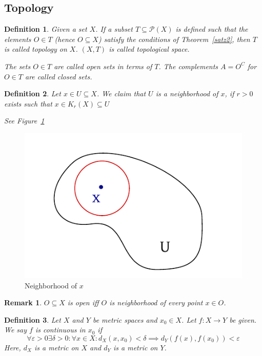\documentclass{article}
\newtheorem{definition}{Definition}  \numberwithin{definition}{section}
\newtheorem{remark}{Remark}  \numberwithin{remark}{section}
\begin{document}
\subsection{Topology}

\begin{definition}
  Given a set $X$. If a subset $T \subseteq \mathcal P(X)$ is defined
  such that the elements $O \in T$ (hence $O \subseteq X$) satisfy the conditions of Theorem~\ref{satz2},
  then $T$ is called \emph{topology on $X$}.
  $(X, T)$ is called topological space.

  The sets $O \in T$ are called \emph{open sets} in terms of $T$.
  The complements $A = O^C$ for $O \in T$ are called \emph{closed sets}.
\end{definition}

\begin{definition}
  Let $x \in U \subseteq X$. We claim that $U$ is a neighborhood of $x$,
  if $r > 0$ exists such that $x \in K_r(X) \subseteq U$

  See Figure~\ref{img:neigh}
\end{definition}

\begin{figure}
  \begin{center}
    \includegraphics{img/06_neighborhood.pdf}
    \caption{Neighborhood of $x$}
    \label{img:neigh}
  \end{center}
\end{figure}

\begin{remark}
  $O \subseteq X$ is open iff $O$ is neighborhood of every point $x \in O$.
\end{remark}

\begin{definition}
  Let $X$ and $Y$ be metric spaces and $x_0 \in X$.
  Let $f: X \to Y$ be given. We say $f$ is continuous in $x_0$ if
  \[ \forall \varepsilon > 0 \exists \delta > 0: \forall x \in X: d_X(x, x_0) < \delta \implies d_Y(f(x), f(x_0)) < \varepsilon \]
  Here, $d_X$ is a metric on $X$ and $d_Y$ is a metric on $Y$.
\end{definition}
\end{document}
